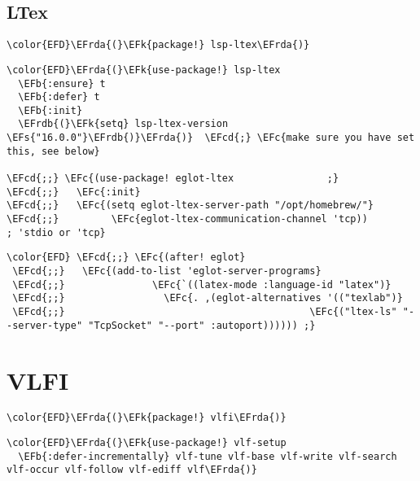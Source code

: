 \documentclass[12pt]{article}
\theoremstyle{plain}%
\theoremstyle{definition}
\theoremstyle{remark}
\newcommand{\EFc}[1]{\textcolor{EFc}{#1}} %
\newcommand{\EFcd}[1]{\textcolor{EFcd}{#1}} %
\newcommand{\EFs}[1]{\textcolor{EFs}{#1}} %
\newcommand{\EFk}[1]{\textcolor{EFk}{#1}} %
\newcommand{\EFb}[1]{\textcolor{EFb}{#1}} %
\newcommand{\EFrda}[1]{\textcolor{EFrda}{#1}} %
\newcommand{\EFrdb}[1]{\textcolor{EFrdb}{#1}} %
\begin{document}
\subsection{LTex}
\label{sec:org48795fe}
\begin{Code}
\begin{Verbatim}
\color{EFD}\EFrda{(}\EFk{package!} lsp-ltex\EFrda{)}
\end{Verbatim}
\end{Code}
\begin{Code}
\begin{Verbatim}
\color{EFD}\EFrda{(}\EFk{use-package!} lsp-ltex
  \EFb{:ensure} t
  \EFb{:defer} t
  \EFb{:init}
  \EFrdb{(}\EFk{setq} lsp-ltex-version \EFs{"16.0.0"}\EFrdb{)}\EFrda{)}  \EFcd{;} \EFc{make sure you have set this, see below}

\EFcd{;;} \EFc{(use-package! eglot-ltex                ;}
\EFcd{;;}   \EFc{:init}
\EFcd{;;}   \EFc{(setq eglot-ltex-server-path "/opt/homebrew/"}
\EFcd{;;}         \EFc{eglot-ltex-communication-channel 'tcp))         ; 'stdio or 'tcp}
\end{Verbatim}
\end{Code}
\begin{Code}
\begin{Verbatim}
\color{EFD} \EFcd{;;} \EFc{(after! eglot}
 \EFcd{;;}   \EFc{(add-to-list 'eglot-server-programs}
 \EFcd{;;}               \EFc{`((latex-mode :language-id "latex")}
 \EFcd{;;}                 \EFc{. ,(eglot-alternatives '(("texlab")}
 \EFcd{;;}                                          \EFc{("ltex-ls" "--server-type" "TcpSocket" "--port" :autoport)))))) ;}
\end{Verbatim}
\end{Code}
\section{VLFI}
\label{sec:org3f96903}
\begin{Code}
\begin{Verbatim}
\color{EFD}\EFrda{(}\EFk{package!} vlfi\EFrda{)}
\end{Verbatim}
\end{Code}
\begin{Code}
\begin{Verbatim}
\color{EFD}\EFrda{(}\EFk{use-package!} vlf-setup
  \EFb{:defer-incrementally} vlf-tune vlf-base vlf-write vlf-search vlf-occur vlf-follow vlf-ediff vlf\EFrda{)}
\end{Verbatim}
\end{Code}
\end{document}
